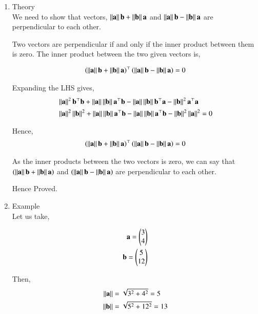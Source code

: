 \documentclass[journal,11pt,twocolumn]{IEEEtran}
\begin{document}
\begin{enumerate}
\item Theory\\
We need to show that vectors, $\left\lVert\mathbf{a}\right\rVert\mathbf{b}+\left\lVert\mathbf{b}\right\rVert\mathbf{a}$ and $\left\lVert\mathbf{a}\right\rVert\mathbf{b}-\left\lVert\mathbf{b}\right\rVert\mathbf{a}$ are perpendicular to each other.

Two vectors are perpendicular if and only if the inner product between them is zero. The inner product between the two given vectors is,

\begin{align}
\left(\left\lVert\mathbf{a}\right\rVert\mathbf{b}+\left\lVert\mathbf{b}\right\rVert\mathbf{a}\right)^{\top} \left(\left\lVert\mathbf{a}\right\rVert\mathbf{b}-\left\lVert\mathbf{b}\right\rVert\mathbf{a}\right) = 0
\end{align}

Expanding the LHS gives,
\begin{align}
&\left\lVert\mathbf{a}\right\rVert^2\mathbf{b}^{\top} \mathbf{b}+\left\lVert\mathbf{a}\right\rVert\left\lVert\mathbf{b}\right\rVert \mathbf{a}^{\top}\mathbf{b}-\left\lVert\mathbf{a}\right\rVert\left\lVert\mathbf{b}\right\rVert\mathbf{b}^{\top}\mathbf{a}-\left\lVert\mathbf{b}\right\rVert^2 \mathbf{a}^{\top}\mathbf{a}\\
	&\left\lVert\mathbf{a}\right\rVert^2\left\lVert\mathbf{b}\right\rVert^2+\left\lVert\mathbf{a}\right\rVert\left\lVert\mathbf{b}\right\rVert\mathbf{a}^{\top}\mathbf{b}-\left\lVert\mathbf{a}\right\rVert\left\lVert\mathbf{b}\right\rVert\mathbf{a}^{\top}\mathbf{b}-\left\lVert\mathbf{b}\right\rVert^2\left\lVert\mathbf{a}\right\rVert^2=0
\end{align}

Hence,
\begin{align}
\left(\left\lVert\mathbf{a}\right\rVert\mathbf{b}+\left\lVert\mathbf{b}\right\rVert\mathbf{a}\right)^{\top} \left(\left\lVert\mathbf{a}\right\rVert\mathbf{b}-\left\lVert\mathbf{b}\right\rVert\mathbf{a}\right) = 0
\end{align}


As the inner products between the two vectors is zero, we can say that $ \left(\left\lVert\mathbf{a}\right\rVert\mathbf{b}+\left\lVert\mathbf{b}\right\rVert\mathbf{a}\right)$ and $\left(\left\lVert\mathbf{a}\right\rVert\mathbf{b}-\left\lVert\mathbf{b}\right\rVert\mathbf{a}\right)$ are perpendicular to each other.

Hence Proved.

\item Example\\
Let us take, 

\begin{align}
	\mathbf{a} = \begin{pmatrix}3 \\ 4\end{pmatrix}\\ 
	\mathbf{b} = \begin{pmatrix}5\\ 12\end{pmatrix}
\end{align}

Then,
\begin{align}
	\left\lVert\mathbf{a}\right\rVert &= \sqrt{3^2+4^2} = 5\\
	\left\lVert\mathbf{b}\right\rVert &= \sqrt{5^2+12^2} = 13
\end{align}


\end{enumerate}
\end{document}
